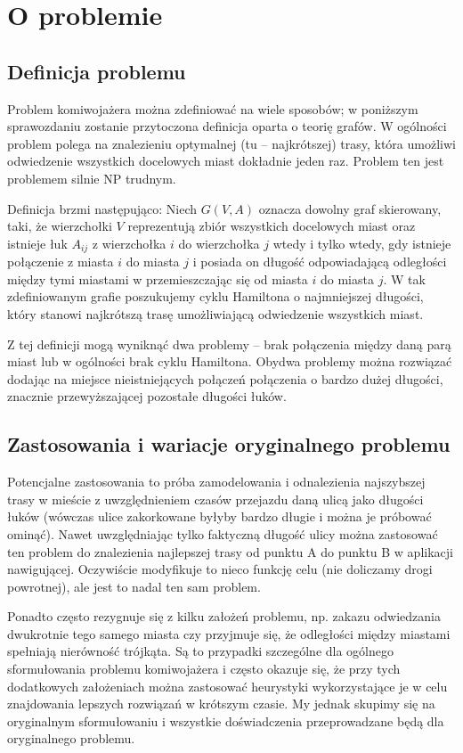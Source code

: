 \section{O problemie}
\subsection{Definicja problemu}
Problem komiwojażera można zdefiniować na wiele sposobów; w poniższym sprawozdaniu zostanie przytoczona definicja oparta o teorię grafów. W ogólności problem polega na znalezieniu optymalnej (tu -- najkrótszej) trasy, która umożliwi odwiedzenie wszystkich docelowych miast dokładnie jeden raz. Problem ten jest problemem silnie NP trudnym.

Definicja brzmi następująco: Niech $G(V,A)$ oznacza dowolny graf skierowany, taki, że wierzchołki $V$ reprezentują zbiór wszystkich docelowych miast oraz istnieje łuk $A_{ij}$ z wierzchołka $i$ do wierzchołka $j$ wtedy i tylko wtedy, gdy istnieje połączenie z miasta $i$ do miasta $j$ i posiada on długość odpowiadającą odległości między tymi miastami w przemieszczając się od miasta $i$ do miasta $j$. W tak zdefiniowanym grafie poszukujemy cyklu Hamiltona o najmniejszej długości, który stanowi najkrótszą trasę umożliwiającą odwiedzenie wszystkich miast.

Z tej definicji mogą wyniknąć dwa problemy -- brak połączenia między daną parą miast lub w ogólności brak cyklu Hamiltona. Obydwa problemy można rozwiązać dodając na miejsce nieistniejących połączeń połączenia o bardzo dużej długości, znacznie przewyższającej pozostałe długości łuków.

\subsection{Zastosowania i wariacje oryginalnego problemu}
Potencjalne zastosowania to próba zamodelowania i odnalezienia najszybszej trasy w mieście z uwzględnieniem czasów przejazdu daną ulicą jako długości łuków (wówczas ulice zakorkowane byłyby bardzo długie i można je próbować ominąć). Nawet uwzględniając tylko faktyczną długość ulicy można zastosować ten problem do znalezienia najlepszej trasy od punktu A do punktu B w aplikacji nawigującej. Oczywiście modyfikuje to nieco funkcję celu (nie doliczamy drogi powrotnej), ale jest to nadal ten sam problem.

Ponadto często rezygnuje się z kilku założeń problemu, np. zakazu odwiedzania dwukrotnie tego samego miasta czy przyjmuje się, że odległości między miastami spełniają nierówność trójkąta. Są to przypadki szczególne dla ogólnego sformułowania problemu komiwojażera i często okazuje się, że przy tych dodatkowych założeniach można zastosować heurystyki wykorzystające je w celu znajdowania lepszych rozwiązań w krótszym czasie. My jednak skupimy się na oryginalnym sformułowaniu i wszystkie doświadczenia przeprowadzane będą dla oryginalnego problemu.